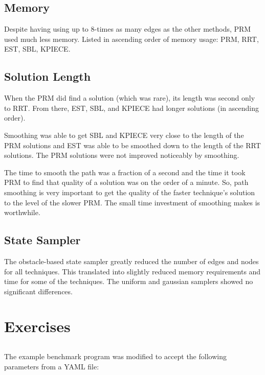 \documentclass[twocolumn]{article}
\begin{document}
\subsection{Memory}

Despite having using up to 8-times as many edges as the other methods, PRM used much less memory. Listed in ascending order of memory usage: PRM, RRT, EST, SBL, KPIECE.


\subsection{Solution Length}

When the PRM did find a solution (which was rare), its length was second only to RRT. From there, EST, SBL, and KPIECE had longer solutions (in ascending order).

Smoothing was able to get SBL and KPIECE very close to the length of the PRM solutions and EST was able to be smoothed down to the length of the RRT solutions. The PRM solutions were not improved noticeably by smoothing.

The time to smooth the path was a fraction of a second and the time it took PRM to find that quality of a solution was on the order of a minute. So, path smoothing is very important to get the quality of the faster technique's solution to the level of the slower PRM. The small time investment of smoothing makes is worthwhile.


\subsection{State Sampler}

The obstacle-based state sampler greatly reduced the number of edges and nodes for all techniques. This translated into slightly reduced memory requirements and time for some of the techniques. The uniform and gaussian samplers showed no significant differences.


\section{Exercises}

\subsection{}

The example benchmark program was modified to accept the following parameters from a YAML file:
\end{document}
